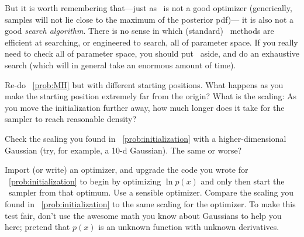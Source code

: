 \documentclass[modern]{aastex61}
\newcommand{\MCMC}{\acronym{MCMC}}
\begin{document}
But it is worth remembering that---just as \MCMC\ is not a good optimizer
(generically, samples will not lie close to the maximum of the posterior pdf)---%
it is also not a good \emph{search algorithm}.
There is no sense in which (standard) \MCMC\ methods are efficient at
searching, or engineered to search, all of parameter space.
If you really need to check all of parameter space, you should put
\MCMC\ aside, and do an exhaustive search (which will in general take an enormous
  amount of time).

\begin{problem}\label{prob:initialization}
Re-do \problemname~\ref{prob:MH} but with different starting
positions.
What happens as you make the starting position extremely far from the
origin?
What is the scaling:  As you move the initialization further away,
how much longer does it take for the sampler to reach reasonable
density?
\end{problem}

\begin{problem}\label{prob:initialization2}
Check the scaling you found in \problemname~\ref{prob:initialization}
with a higher-dimensional Gaussian (try, for example, a 10-d Gaussian).
The same or worse?
\end{problem}

\begin{problem}\label{prob:optimization}
Import (or write) an optimizer, and upgrade the code you wrote for
\problemname~\ref{prob:initialization} to begin by optimizing $\ln
p(x)$ and only then start the \MCMC\ sampler from that optimum.
Use a sensible optimizer.
Compare the scaling you found in
\problemname~\ref{prob:initialization} to the same scaling for the
optimizer.
To make this test fair, don't use the awesome math you know about
Gaussians to help you here; pretend that $p(x)$ is an unknown function
with unknown derivatives.
\end{problem}
\end{document}

